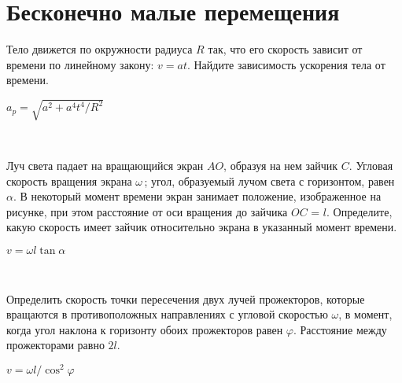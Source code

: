 \section{Бесконечно малые перемещения}

\begin{ex}
Тело движется по окружности радиуса $R$ так, что его скорость зависит от времени по линейному закону: $v = at$. Найдите зависимость ускорения тела от времени.
\begin{ans}
$a_p = \sqrt{a^2 + a^4t^4/R^2}$
\end{ans}
\end{ex}

\begin{ex}
\hspace{0pt} \\
\begin{minipage}{.65\textwidth}
Луч света падает на вращающийся экран $AO$, образуя на нем зайчик $C$. Угловая скорость вращения экрана $\omega$\,; угол, образуемый лучом света с горизонтом, равен $\alpha$. В некоторый момент времени экран занимает положение, изображенное на рисунке, при этом расстояние от оси вращения до зайчика $OC$ = $l$. Определите, какую скорость имеет зайчик относительно экрана в указанный момент времени.
\end{minipage}
\begin{minipage}{.35\textwidth}
\centering

\end{minipage}
\begin{ans}
$v = \omega l \tan \alpha$
\end{ans}
\end{ex}

\begin{ex}
\hspace{0pt} \\
\begin{minipage}{.65\textwidth}
Определить скорость точки пересечения двух лучей прожекторов, которые вращаются в противоположных направлениях с угловой скоростью $\omega$, в момент, когда угол наклона к горизонту обоих прожекторов равен $\varphi$. Расстояние между прожекторами равно $2l$.
\end{minipage}
\begin{minipage}{.35\textwidth}
\centering

\end{minipage}
\begin{ans}
$v = \omega l/ \cos^2 \varphi$
\end{ans}
\end{ex}

